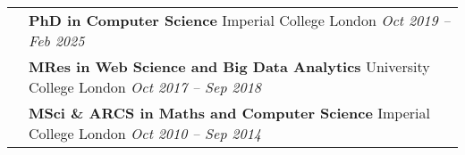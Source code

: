 \documentclass[letterpaper, 8pt]{article}
\begin{document}
\begin{longtable}{p{0.5in}p{5.5in}}
\\

{\color{OliveGreen}{Education}} 
& \textbf{PhD in Computer Science} \hfill  Imperial College London \textit{Oct 2019 -- Feb 2025} \\ 
& \textbf{MRes in Web Science and Big Data Analytics} \hfill  University College London \textit{Oct 2017 -- Sep 2018} \\
& \textbf{MSci \& ARCS in Maths and Computer Science}  \hfill Imperial College London \textit{Oct 2010 -- Sep 2014}\\


\end{longtable}
\end{document}
